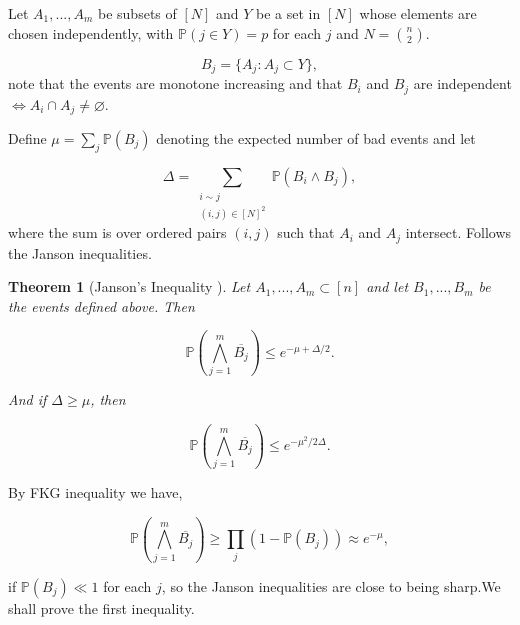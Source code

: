 \documentclass[12pt,twoside,a4paper]{book}
\numberwithin{equation}{section}
\let\emptyset=\varnothing
\newtheorem{theorem}             {Theorem}[section]
\theoremstyle{remark}
\begin{document}
Let $A_1, ... , A_m$ be subsets of $[N]$ and $Y$ be a set in $[N]$ whose elements are chosen independently, with $\mathbb{P}(j \in Y) = p$ for each $j$ and $N=\binom{n}{2}$. 

$$ B_j = \{A_j \colon A_j \subset Y\},$$
note that the events are monotone increasing and that $B_i$ and $B_j$ are independent $\iff A_i \cap A_j \neq \emptyset$. 

Define $\mu = \sum_j \mathbb{P}(B_j)$ denoting the expected number of bad events and let

$$ \Delta = \sum_{\substack{i\sim j\\ (i,j) \in [N]^2}} \mathbb{P}(B_i \wedge B_j), $$
where the sum is over ordered pairs $(i,j)$ such that $A_i$ and $A_j$ intersect. Follows the Janson inequalities.

\begin{theorem}[{Janson's Inequality \cite{Ja87}}]
Let $A_1,...,A_m \subset [n]$ and let $B_1,...,B_m$ be the events defined above. Then

$$ \mathbb{P}\left(\bigwedge_{j=1}^m \overline{B_j}\right) \leq e^{-\mu + \Delta/2}. $$

And if $\Delta \geq \mu$, then

$$ \mathbb{P}\left( \bigwedge_{j=1}^m \overline{B_j} \right) \leq e^{-\mu ^2 /2\Delta}.$$
\end{theorem}
By FKG inequality we have,

$$ \mathbb{P}\left( \bigwedge_{j=1}^m \overline{B_j} \right) \geq \prod_j (1-\mathbb{P}(B_j)) \approx e^{-\mu}, $$

if $\mathbb{P}(B_j) \ll 1$ for each $j$, so the Janson inequalities are close to being sharp.We shall prove the first inequality.
\end{document}
